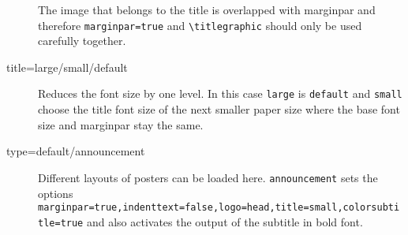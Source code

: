 \documentclass[
	english,%
	paper=a0,%
	accentcolor=9c,%
	logo=body,%
	footer=true,
]{tudaposter}
\newcommand*{\code}[1]{\texttt{#1}}
\let\tbs\textbackslash
\begin{document}
\begin{multicols}{2}
\begin{description}
		      The image that belongs to the title is overlapped with marginpar and therefore \code{marginpar=true} and \code{\tbs{}titlegraphic} should only be used carefully together.
		\item[title=large/small/default] Reduces the font size by one level. In this case \code{large} is \code{default} and \code{small} choose the title font size of the next smaller paper size where the base font size and marginpar stay the same.
		\item[type=default/announcement] Different layouts of posters can be loaded here.
		      \code{announcement} sets the options \code{marginpar=true,indenttext=false,logo=head,title=small,colorsubtitle=true} and also activates the output of the subtitle in bold font.
	\end{description}
\end{multicols}
\end{document}
